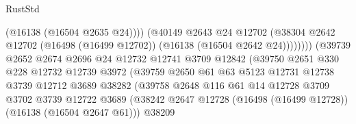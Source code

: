 \begin{lexlean}{RustStd}
\begin{coremodule}
                                              (@16138 (@16504 @2635 @24))))
                                          (@40149
                                            @2643
                                            @24
                                            @12702
                                            (@38304
                                              @2642
                                              @12702
                                              (@16498 (@16499 @12702))
                                              (@16138 (@16504 @2642 @24))))))))
                                  (@39739
                                    @2652
                                    @2674
                                    @2696
                                    @24
                                    @12732
                                    @12741
                                    @3709
                                    @12842
                                    (@39750
                                      @2651
                                      @330
                                      @228
                                      @12732
                                      @12739
                                      @3972
                                      (@39759
                                        @2650
                                        @61
                                        @63
                                        @5123
                                        @12731
                                        @12738
                                        @3739
                                        @12712
                                        @3689
                                        @38282
                                        (@39758
                                          @2648
                                          @116
                                          @61
                                          @14
                                          @12728
                                          @3709
                                          @3702
                                          @3739
                                          @12722
                                          @3689
                                          (@38242
                                            @2647
                                            @12728
                                            (@16498 (@16499 @12728))
                                            (@16138 (@16504 @2647 @61)))
                                          @38209

\end{coremodule}
\end{lexlean}
